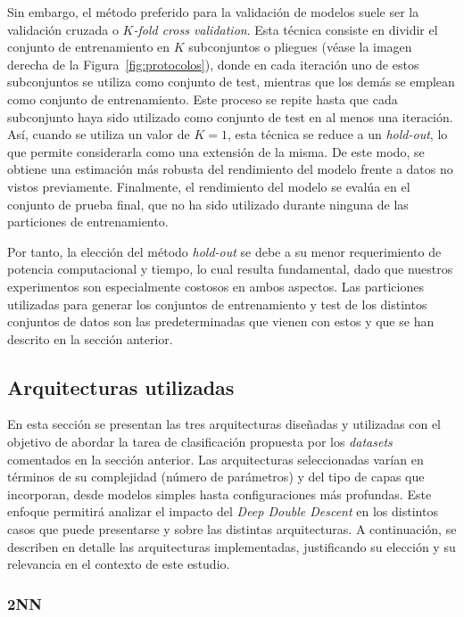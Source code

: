 Sin embargo, el método preferido para la validación de modelos suele ser la validación cruzada o \textit{$K$-fold cross validation}. Esta técnica consiste en dividir el conjunto de entrenamiento en $K$ subconjuntos o pliegues (véase la imagen derecha de la Figura~\ref{fig:protocolos}), donde en cada iteración uno de estos subconjuntos se utiliza como conjunto de test, mientras que los demás se emplean como conjunto de entrenamiento. Este proceso se repite hasta que cada subconjunto haya sido utilizado como conjunto de test en al menos una iteración. Así, cuando se utiliza un valor de $K = 1$, esta técnica se reduce a un \textit{hold-out}, lo que permite considerarla como una extensión de la misma. De este modo, se obtiene una estimación más robusta del rendimiento del modelo frente a datos no vistos previamente. Finalmente, el rendimiento del modelo se evalúa en el conjunto de prueba final, que no ha sido utilizado durante ninguna de las particiones de entrenamiento.

Por tanto, la elección del método \textit{hold-out} se debe a su menor requerimiento de potencia computacional y tiempo, lo cual resulta fundamental, dado que nuestros experimentos son especialmente costosos en ambos aspectos. Las particiones utilizadas para generar los conjuntos de entrenamiento y test de los distintos conjuntos de datos son las predeterminadas que vienen con estos y que se han descrito en la sección anterior.

\subsection{Arquitecturas utilizadas}\label{subsec:arquitecturas}

En esta sección se presentan las tres arquitecturas diseñadas y utilizadas con el objetivo de abordar la tarea de clasificación propuesta por los \textit{datasets} comentados en la sección anterior. Las arquitecturas seleccionadas varían en términos de su complejidad (número de parámetros) y del tipo de capas que incorporan, desde modelos simples hasta configuraciones más profundas. Este enfoque permitirá analizar el impacto del \textit{Deep Double Descent} en los distintos casos que puede presentarse y sobre las distintas arquitecturas. A continuación, se describen en detalle las arquitecturas implementadas, justificando su elección y su relevancia en el contexto de este estudio.

\subsubsection{2NN}\label{subsubsec:2NN}

